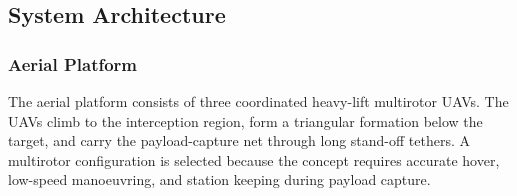 







\subsection{System Architecture}
\label{subsec:concept_D_architecture}

\subsubsection{Aerial Platform}

The aerial platform consists of three coordinated heavy-lift multirotor UAVs. The UAVs climb to the interception region, form a triangular formation below the target, and carry the payload-capture net through long stand-off tethers. A multirotor configuration is selected because the concept requires accurate hover, low-speed manoeuvring, and station keeping during payload capture.


